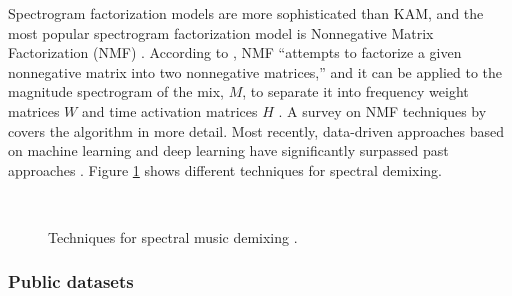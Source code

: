 \documentclass[report.tex]{subfiles}
\begin{document}
Spectrogram factorization models are more sophisticated than KAM, and the most popular spectrogram factorization model is Nonnegative Matrix Factorization (NMF) \parencite{musicmask, musicsepgood}. According to \citeauthor{musicsepgood}, NMF ``attempts to factorize a given nonnegative matrix into two nonnegative matrices,'' and it can be applied to the magnitude spectrogram of the mix, $M$, to separate it into frequency weight matrices $W$ and time activation matrices $H$ \parencite[37]{musicsepgood}. A survey on NMF techniques by \textcite{nmfpaper} covers the algorithm in more detail. Most recently, data-driven approaches based on machine learning and deep learning have significantly surpassed past approaches \parencite{musicsepgood, sisec2018}. Figure \ref{fig:spectraldemix} shows different techniques for spectral demixing.

\begin{figure}[ht]
	\centering
	\\
	\caption{Techniques for spectral music demixing \parencite[36, 38]{musicsepgood}.}
	\label{fig:spectraldemix}
\end{figure}

\subsubsection{Public datasets}
\label{sec:musicsepdatasets}
\end{document}
